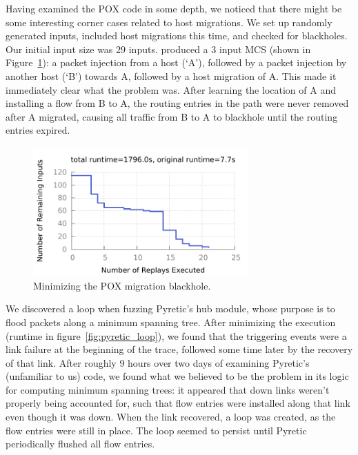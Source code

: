  Having
examined the POX code in some depth, we noticed that there might be
some interesting corner cases related to host migrations.
We set up randomly generated inputs, included host
migrations this time, and checked for blackholes. Our initial input size was
$29$ inputs.
\projectname produced a $3$ input MCS (shown
in Figure~\ref{fig:pox_migration}): a packet injection from a
host (`A'), followed
by a packet injection by another host (`B') towards A, followed by a host migration of A. This made it immediately
clear what the problem was. After learning the location of A and installing a
flow from B to A, the routing entries in the path were never removed after A
migrated, causing all traffic from B to A to blackhole until the routing
entries expired.

\begin{figure}[t]
    \includegraphics[width=3.25in]{../graphs/runtime/pox_migration_blackhole.pdf}
    \caption[]{\label{fig:pox_migration} Minimizing the POX migration
    blackhole.}
\end{figure}

 We discovered a loop when fuzzing Pyretic's hub
module, whose purpose is to flood packets along a minimum spanning tree. After
minimizing the execution (runtime in figure~\ref{fig:pyretic_loop}), we found that the triggering events
were a link failure at the beginning of the trace, followed some time later by
the recovery of that link. After roughly 9 hours over two days of examining
Pyretic's (unfamiliar to us) code, we found what we believed to be the problem
in its logic for computing minimum spanning trees: it appeared that down links
weren't properly being accounted for, such that flow entries were installed
along that link even though it was down. When the link recovered, a loop was
created, as the flow entries were still in place. The loop seemed to persist until
Pyretic periodically flushed all flow entries.

